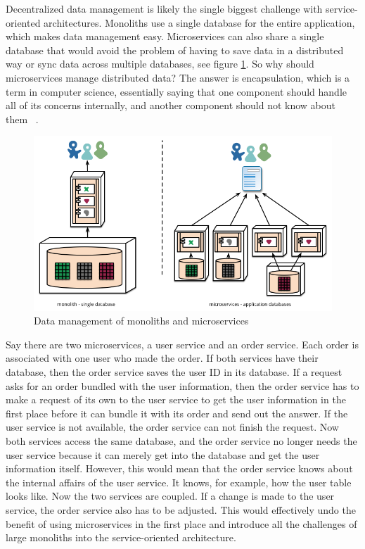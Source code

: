 Decentralized data management is likely the single biggest challenge with service-oriented architectures. Monoliths use a single database for the entire application, which makes data management easy. Microservices can also share a single database that would avoid the problem of having to save data in a distributed way or sync data across multiple databases, see figure \ref{fig:decentralised-data}. So why should microservices manage distributed data? The answer is encapsulation, which is a term in computer science, essentially saying that one component should handle all of its concerns internally, and another component should not know about them ~\cite{krivtsov.2019}.

\begin{figure}[ht!]
  \centering
  \includegraphics[width=0.7\linewidth]{assets/decentralised-data.png}
  \caption{Data management of monoliths and microservices}
  \label{fig:decentralised-data}
\end{figure}

Say there are two microservices, a user service and an order service. Each order is associated with one user who made the order. If both services have their database, then the order service saves the user ID in its database. If a request asks for an order bundled with the user information, then the order service has to make a request of its own to the user service to get the user information in the first place before it can bundle it with its order and send out the answer. If the user service is not available, the order service can not finish the request. Now both services access the same database, and the order service no longer needs the user service because it can merely get into the database and get the user information itself. However, this would mean that the order service knows about the internal affairs of the user service. It knows, for example, how the user table looks like. Now the two services are coupled. If a change is made to the user service, the order service also has to be adjusted. This would effectively undo the benefit of using microservices in the first place and introduce all the challenges of large monoliths into the service-oriented architecture.

